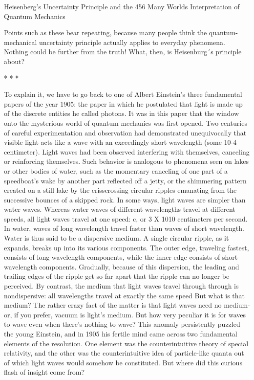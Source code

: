 Heisenberg's Uncertainty Principle and the                                            456
Many Worlds Interpretation of Quantum Mechanics

       Points such as these bear repeating, because many people think the quantum-
mechanical uncertainty principle actually applies to everyday phenomena. Nothing
could be further from the truth! What, then, is Heisenburg´s principle about?

                                        *   *   *

        To explain it, we have to go back to one of Albert Einstein's three fundamental
papers of the year 1905: the paper in which he postulated that light is made up of the
discrete entities he called photons. It was in this paper that the window onto the
mysterious world of quantum mechanics was first opened. Two centuries of careful
experimentation and observation had demonstrated unequivocally that visible light
acts like a wave with an exceedingly short wavelength (some 10-4 centimeter). Light
waves had been observed interfering with themselves, canceling or reinforcing
themselves. Such behavior is analogous to phenomena seen on lakes or other bodies
of water, such as the momentary canceling of one part of a speedboat's wake by
another part reflected off a jetty, or the shimmering pattern created on a still lake by
the crisscrossing circular ripples emanating from the successive bounces of a skipped
rock.
        In some ways, light waves are simpler than water waves. Whereas water
waves of different wavelengths travel at different speeds, all light waves travel at one
speed: c, or 3 X 1010 centimeters per second. In water, waves of long wavelength
travel faster than waves of short wavelength. Water is thus said to be a dispersive
medium. A single circular ripple, as it expands, breaks up into its various components.
The outer edge, traveling fastest, consists of long-wavelength components, while the
inner edge consists of short-wavelength components. Gradually, because of this
dispersion, the leading and trailing edges of the ripple get so far apart that the ripple
can no longer be perceived. By contrast, the medium that light waves travel through
through is nondispersive: all wavelengths travel at exactly the same speed But what is
that medium? The rather crazy fact of the matter is that light waves need no medium-
or, if you prefer, vacuum is light's medium. But how very peculiar it is for waves to
wave even when there's nothing to wave?
        This anomaly persistently puzzled the young Einstein, and in 1905 his fertile
mind came across two fundamental elements of the resolution. One element was the
counterintuitive theory of special relativity, and the other was the counterintuitive idea
of particle-like quanta out of which light waves would somehow be constituted. But
where did this curious flash of insight come from?


